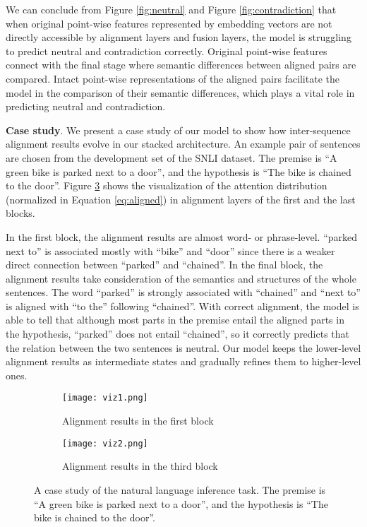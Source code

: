 \documentclass[11pt,a4paper]{article}
\begin{document}
We can conclude from Figure \ref{fig:neutral} and Figure \ref{fig:contradiction} that when original point-wise features represented by embedding vectors are not directly accessible by alignment layers and fusion layers, the model is struggling to predict neutral and contradiction correctly. Original point-wise features connect with the final stage where semantic differences between aligned pairs are compared. Intact point-wise representations of the aligned pairs facilitate the model in the comparison of their semantic differences, which plays a vital role in predicting neutral and contradiction.

{\bf Case study}. We present a case study of our model to show how inter-sequence alignment results evolve in our stacked architecture. An example pair of sentences are chosen from the development set of the SNLI dataset. The premise is ``A green bike is parked next to a door'', and the hypothesis is ``The bike is chained to the door''. Figure \ref{fig:example} shows the visualization of the attention distribution (normalized  in Equation \ref{eq:aligned}) in alignment layers of the first and the last blocks. 

In the first block, the alignment results are almost word- or phrase-level. ``parked next to'' is associated mostly with ``bike'' and ``door'' since there is a weaker direct connection between ``parked'' and ``chained''. In the final block, the alignment results take consideration of the semantics and structures of the whole sentences. The word ``parked'' is strongly associated with ``chained'' and ``next to'' is aligned with ``to the'' following ``chained''. With correct alignment, the model is able to tell that although most parts in the premise entail the aligned parts in the hypothesis, ``parked'' does not entail ``chained'', so it correctly predicts that the relation between the two sentences is neutral. Our model keeps the lower-level alignment results as intermediate states and gradually refines them to higher-level ones.

\begin{figure}
  \centering
  \begin{subfigure}{\linewidth}
    \centering
    \texttt{[image: viz1.png]}
    \caption{Alignment results in the first block}
    \label{fig:ex1}
  \end{subfigure}
  \begin{subfigure}{\linewidth}
    \centering
    \texttt{[image: viz2.png]}
    \caption{Alignment results in the third block}
    \label{fig:ex2}
\end{subfigure}
  \caption{A case study of the natural language inference task. The premise is ``A green bike is parked next to a door'', and the hypothesis is ``The bike is chained to the door''. }
  \label{fig:example}
\end{figure}
\end{document}
